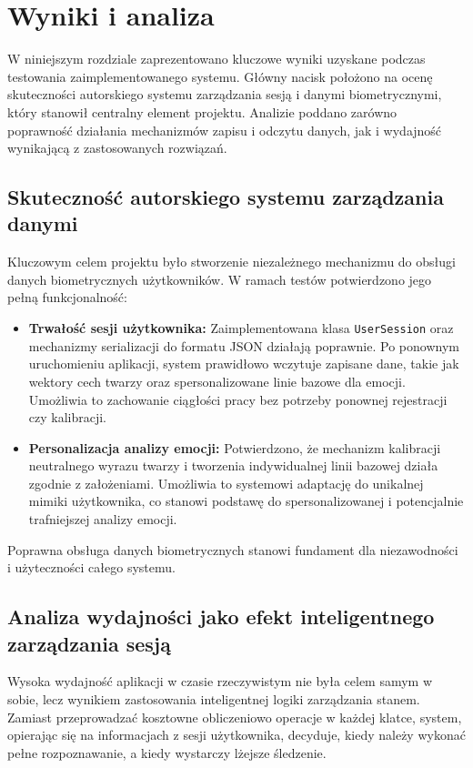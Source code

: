 \chapter{Wyniki i analiza}
\label{ch:wyniki}

W niniejszym rozdziale zaprezentowano kluczowe wyniki uzyskane podczas testowania zaimplementowanego systemu. Główny nacisk położono na ocenę skuteczności autorskiego systemu zarządzania sesją i danymi biometrycznymi, który stanowił centralny element projektu. Analizie poddano zarówno poprawność działania mechanizmów zapisu i odczytu danych, jak i wydajność wynikającą z zastosowanych rozwiązań.

\section{Skuteczność autorskiego systemu zarządzania danymi}

Kluczowym celem projektu było stworzenie niezależnego mechanizmu do obsługi danych biometrycznych użytkowników. W ramach testów potwierdzono jego pełną funkcjonalność:
\begin{itemize}
    \item \textbf{Trwałość sesji użytkownika:} Zaimplementowana klasa \texttt{UserSession} oraz mechanizmy serializacji do formatu JSON działają poprawnie. Po ponownym uruchomieniu aplikacji, system prawidłowo wczytuje zapisane dane, takie jak wektory cech twarzy oraz spersonalizowane linie bazowe dla emocji. Umożliwia to zachowanie ciągłości pracy bez potrzeby ponownej rejestracji czy kalibracji.
    \item \textbf{Personalizacja analizy emocji:} Potwierdzono, że mechanizm kalibracji neutralnego wyrazu twarzy i tworzenia indywidualnej linii bazowej działa zgodnie z założeniami. Umożliwia to systemowi adaptację do unikalnej mimiki użytkownika, co stanowi podstawę do spersonalizowanej i potencjalnie trafniejszej analizy emocji.
\end{itemize}
Poprawna obsługa danych biometrycznych stanowi fundament dla niezawodności i użyteczności całego systemu.

\section{Analiza wydajności jako efekt inteligentnego zarządzania sesją}

Wysoka wydajność aplikacji w czasie rzeczywistym nie była celem samym w sobie, lecz wynikiem zastosowania inteligentnej logiki zarządzania stanem. Zamiast przeprowadzać kosztowne obliczeniowo operacje w każdej klatce, system, opierając się na informacjach z sesji użytkownika, decyduje, kiedy należy wykonać pełne rozpoznawanie, a kiedy wystarczy lżejsze śledzenie.

